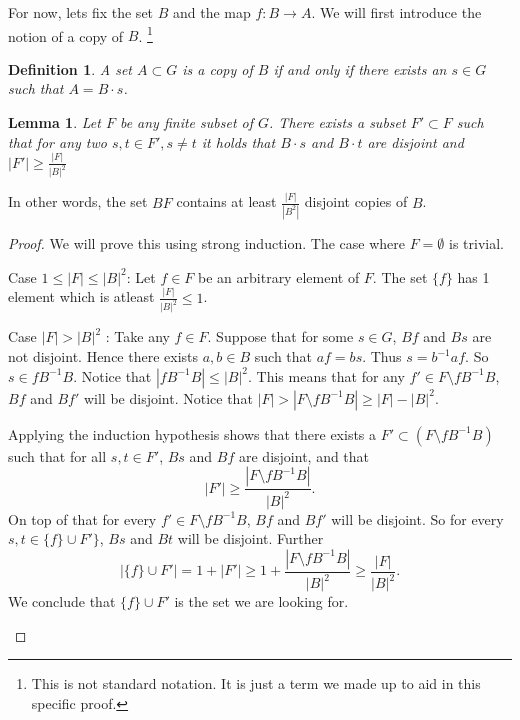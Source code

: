 \documentclass[titlepage, a4paper]{article}
\newcommand{\card}[1]{\left| #1 \right|}
\newtheorem{definition}[theorem]{Definition}
\newtheorem{lemma}[theorem]{Lemma}
\theoremstyle{remark}
\begin{document}
\bigskip

For now, lets fix the set $B$ and the map $f:B \to A$. 
We will first introduce the notion of a copy of $B$. \footnote{This is not standard notation. It is just a term we made up to aid in this specific proof.}
 \begin{definition}
	A set  $A \subset  G$ is a copy of $B$ if and only if there exists an $s \in G$ such that $A = B\cdot s$.
\end{definition}


\begin{lemma}\label{lem:copies_of_B}
	Let $F$ be any finite subset of $G$. There exists a subset $F' \subset F$ such that for any two  $s,t \in F', s\ne t$ it holds that $B\cdot s$ and  $B\cdot t$ are disjoint and $\card{F'} \ge \frac{\card{F}}{\card{B}^2} $
\end{lemma}
In other words, the set  $BF$ contains at least $\frac{\card{F}}{\card{B^2}}$ disjoint copies of $B$.

\begin{proof}
	 We will prove this using strong induction. The case where $F = \emptyset$ is trivial. 
	\begin{description}
		\item{Case $1 \le \card F \le \card{B}^2$:} 
		Let  $f \in F$ be an arbitrary element of $F$. 
		The set $\{f\} $ has 1 element which is atleast $\frac{\card F}{\card B^2} \le 1$.
	\item{Case $\card F > \card{B}^2$ :}
		Take any  $f \in F$. Suppose that for some  $s \in G$,  $Bf$ and  $Bs$ are not disjoint. 
		Hence there exists $a,b \in B$ such that $af = bs$. 
		Thus $s = b^{-1}af$. So $s \in fB^{-1}B$. Notice that $\card{fB^{-1}B}\le \card{B}^2$.
		This means that for any $f' \in F \setminus fB^{-1}B$, $Bf$ and $Bf'$ will be disjoint. 
		Notice that $\card F > \card{F \setminus f B^{-1}B} \ge \card F - \card{B}^2 $.

		Applying the induction hypothesis shows that there exists a $F'\subset  \left( F\setminus fB^{-1}B \right) $ such that  for all  $s, t \in F'$, $Bs$ and $Bf$ are disjoint, 
		and that \[\card {F'}  \ge \frac{\card{F \setminus fB^{-1}B }}{\card{B}^2}.\]
		On top of that for every $f' \in F\setminus fB^{-1}B$, $Bf$ and  $Bf'$ will be disjoint. 
		So for every  $ s, t \in \{ f\} \cup F'\} $,  $Bs$ and $Bt$ will be disjoint.
		Further \[
			\card{\{f\} \cup F'}  = 1 + \card{F' } \ge 1 + \frac{\card{F \setminus fB^{-1}B}}{\card B^2} \ge \frac{\card{F}}{\card{B}^2}
		.\] 
		We conclude that $\{f\} \cup  F'$ is the set we are looking for. 
	\end{description}
\end{proof}
\end{document}

